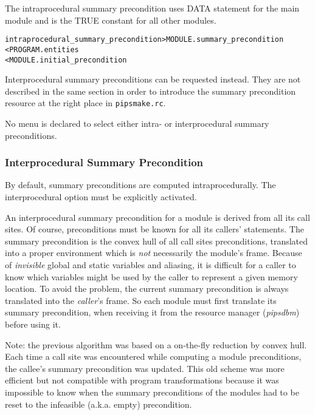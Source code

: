 \documentclass[a4paper]{report}
\newenvironment{PipsMake}{\begin{alltt}}{\end{alltt}}
\newenvironment{PipsPass}[1]{\label{pass:#1}}{}
\begin{document}
The intraprocedural summary precondition uses DATA statement for the main
module and is the TRUE constant for all other modules.

\begin{PipsMake}
intraprocedural_summary_precondition            > MODULE.summary_precondition
        < PROGRAM.entities
        < MODULE.initial_precondition
\end{PipsMake}

Interprocedural summary preconditions can be requested instead. They are
not described in the same section in order to introduce the summary
precondition resource at the right place in \verb/pipsmake.rc/.

No menu is declared to select either intra- or interprocedural summary
preconditions.

\subsubsection{Interprocedural Summary Precondition}

By default, summary preconditions are computed intraprocedurally. The
interprocedural option must be explicitly activated.

\begin{PipsPass}{interprocedural_summary_precondition}
An interprocedural summary precondition for a module is derived from all
its call sites. Of course, preconditions must be known for all its
callers' statements.  The summary precondition is the convex hull of all
call sites preconditions, translated into a proper environment which is
{\em not} necessarily the module's frame. Because of {\em invisible}
global and static variables and aliasing, it is difficult for a caller to
know which variables might be used by the caller to represent a given
memory location. To avoid the problem, the current summary precondition is
always translated into the {\em caller}'s frame. So each module must first
translate its summary precondition, when receiving it from the resource
manager ({\em pipsdbm}) before using it.
\end{PipsPass}

Note: the previous algorithm was based on a on-the-fly reduction by
convex hull. Each time a call site was encountered while computing a
module preconditions, the callee's summary precondition was updated. This
old scheme was more efficient but not compatible with program
transformations because it was impossible to know when the summary
preconditions of the modules had to be reset to the infeasible
(a.k.a. empty) precondition.
\end{document}
